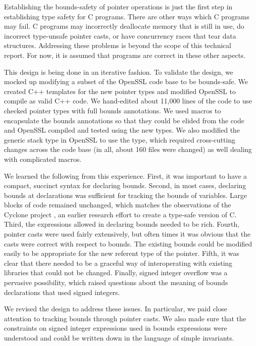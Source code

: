 Establishing the bounds-safety of pointer operations is just the first step in
establishing type safety for C programs. There are other ways which C
programs may fail. C programs may incorrectly deallocate memory that is
still in use, do incorrect type-unsafe pointer casts, or have concurrency
races that tear data structures. Addressing these problems is beyond the
scope of this technical report. For now, it is assumed that programs are
correct in these other aspects.

This design is being done in an iterative fashion.  To validate the
design, we mocked up modifying a subset of the OpenSSL
code base \cite{OpenSSL2015} to be bounds-safe.
We created C++ templates for the new pointer types and modified OpenSSL to
compile as valid C++ code.
We hand-edited about 11,000 lines of the code to use checked pointer
types with full bounds annotations.  We used macros to encapsulate
the bounds annotations so that they could be elided from the code
and OpenSSL compiled and tested using the new types.  We also modified the
generic stack type in OpenSSL to use the  type, which required
cross-cutting changes across the code base (in all, about 160 files were changed)
as well dealing with complicated macros.

We learned the following from this
experience.   First, it was important to have a compact, succinct syntax
for declaring bounds.
Second, in most cases, declaring bounds at declarations was sufficient for
tracking the bounds of variables.  Large blocks of code
remained unchanged, which matches the observations of the
Cyclone project \cite{Jim2002}, an earlier research
effort to create a type-safe version of C.
Third, the expressions allowed in declaring
bounds needed to be rich.  Fourth, pointer casts were used
fairly extensively, but often times it was obvious that the casts were
correct with respect to bounds.  The existing bounds could be modified
easily to be appropriate for the new referent type of the pointer.
Fifth, it was clear that there needed
to be a graceful way of interoperating with existing libraries that could
not be changed.   Finally, signed integer overflow was a pervasive
possibility, which raised questions about the meaning of bounds
declarations that used signed integers.

We revised the design to
address these issues.  In particular, we paid close attention to
tracking bounds through pointer casts.  We also made sure that the
constraints on signed integer expressions used in bounds expressions
were understood and could be written down in the language of
simple invariants.


